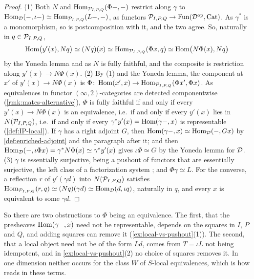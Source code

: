 \begin{proof}
%
(1) Both $N$ and
$\operatorname{Hom}_{\mathcal{P}_{I,P,Q}}(\Phi-,-)$
restrict along $\gamma$ to
$\operatorname{Hom}_{\mathcal{D}}(-,\iota-) \simeq \operatorname{Hom}_{\mathcal{P}_{I,P,Q}}(L-,-)$,
as functors
$\mathcal{P}_{I,P,Q} \to \operatorname{Fun}(\mathcal{D}^{\mathrm{op}},\mathrm{Cat})$.
As $\gamma^{*}$ is a monomorphism, so is postcomposition with it,
and the two agree. So, naturally in $q \in \mathcal{P}_{I,P,Q}$,
\begin{equation*}
\operatorname{Hom}\bigl(y'(x),Nq\bigr) \simeq (Nq)(x) \simeq \operatorname{Hom}_{\mathcal{P}_{I,P,Q}}(\Phi x,q)
\simeq
\operatorname{Hom}\bigl(N\Phi(x),Nq\bigr)
\end{equation*}
by the Yoneda lemma and as $N$ is fully faithful,
and the composite is restriction along $y'(x) \to N\Phi(x)$.
(2) By (1) and the Yoneda lemma, the component at $x'$ of $y'(x) \to N\Phi(x)$
is
$\Phi\colon \operatorname{Hom}(x',x) \to \operatorname{Hom}_{\mathcal{P}_{I,P,Q}}(\Phi x',\Phi x)$.
As equivalences in functor $(\infty,2)$-categories are detected componentwise
(\cref{rmk:mates-alternative}), $\Phi$ is fully faithful if and only if every
$y'(x) \to N\Phi(x)$ is an equivalence, i.e.\ if and only if every $y'(x)$ lies
in $N(\mathcal{P}_{I,P,Q})$, i.e.\ if and only if every
$\gamma^{*}y'(x) = \operatorname{Hom}(\gamma-,x)$
is representable (\cref{def:IP-local}). If $\gamma$ has a right adjoint $G$,
then
$\operatorname{Hom}(\gamma-,x) \simeq \operatorname{Hom}_{\mathcal{D}}(-,Gx)$
by \cref{def:enriched-adjoint} and the paragraph after it; and then
$\operatorname{Hom}_{\mathcal{D}}(-,\iota\Phi x) = \gamma^{*}N\Phi(x) \simeq \gamma^{*}y'(x)$
gives $\iota\Phi \simeq G$ by the Yoneda lemma for $\mathcal{D}$.
(3) $\gamma$ is essentially surjective, being a pushout of functors that are
essentially surjective, the left class of a factorization system
\cite{gepnerhaugseng2015enriched}; and $\Phi\gamma \simeq L$.
For the converse, a reflection $r$ of $y'(\gamma d)$ into $N(\mathcal{P}_{I,P,Q})$
satisfies
$\operatorname{Hom}_{\mathcal{P}_{I,P,Q}}(r,q) \simeq (Nq)(\gamma d) \simeq \operatorname{Hom}_{\mathcal{D}}(d,\iota q)$,
naturally in $q$, and every $x$ is equivalent to some $\gamma d$.
\end{proof}

%
So there are two obstructions to $\Phi$ being an equivalence. The first,
that the presheaves $\operatorname{Hom}(\gamma-,x)$ need not be representable,
depends on the squares in $I$, $P$ and $Q$, and adding squares can remove it
(\cref{ex:local-vs-pushout}(1)). The second,
that a local object need not be of the form $Ld$,
comes from $T = \iota L$ not being idempotent,
and in \cref{ex:local-vs-pushout}(2) no choice of squares removes it.
In one dimension neither occurs for the class $W$ of $S$-local equivalences,
which is how \cite[5.2.7.12]{htt} reads in these terms.

